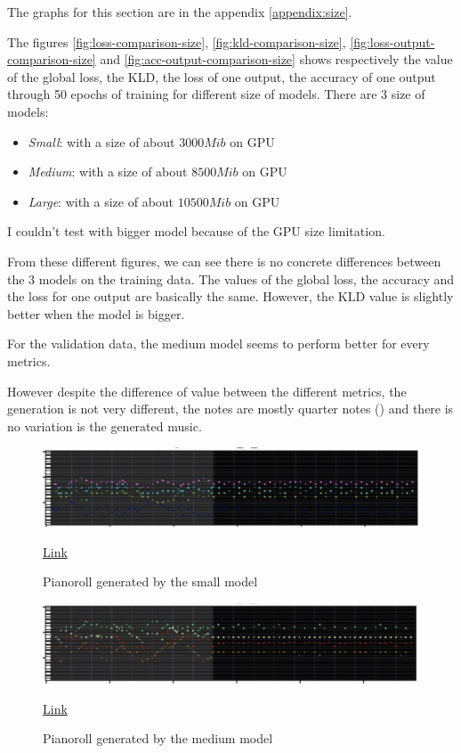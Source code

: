 \documentclass[12pt]{report}
\begin{document}
The graphs for this section are in the appendix \ref{appendix:size}.


The figures \ref{fig:loss-comparison-size}, \ref{fig:kld-comparison-size}, \ref{fig:loss-output-comparison-size} and \ref{fig:acc-output-comparison-size} shows respectively the value of the global loss, the KLD, the loss of one output, the accuracy of one output through 50 epochs of training for different size of models.
There are 3 size of models:
\begin{itemize}
    \item \textit{Small}: with a size of about $3000Mib$ on GPU
    \item \textit{Medium}: with a size of about $8500Mib$ on GPU
    \item \textit{Large}: with a size of about $10500Mib$ on GPU
\end{itemize}

I couldn't test with bigger model because of the GPU size limitation.

From these different figures, we can see there is no concrete differences between the 3 models on the training data.
The values of the global loss, the accuracy and the loss for one output are basically the same.
However, the KLD value is slightly better when the model is bigger.

For the validation data, the medium model seems to perform better for every metrics.

However despite the difference of value between the different metrics, the generation is not very different, the notes are mostly quarter notes (\musQuarter) and there is no variation is the generated music.

\begin{figure}[htbp]
    \centering
    \includegraphics[width=\textwidth]{images/experiences/size/generation-comparison-size-small.jpg}
    \caption{Pianoroll generated by the small model}
    \href{https://github.com/ValentinVignal/midiGenerator/blob/master/samples/mode-size-comparison/small.mid}{Link}
    \label{fig:exp:size:generation-small}
\end{figure}

\begin{figure}[htbp]
    \centering
    \includegraphics[width=\textwidth]{images/experiences/size/generation-comparison-size-medium.jpg}
    \caption{Pianoroll generated by the medium model}
    \href{https://github.com/ValentinVignal/midiGenerator/blob/master/samples/mode-size-comparison/medium.mid}{Link}
    \label{fig:exp:size:generation-medium}
\end{figure}
\end{document}
